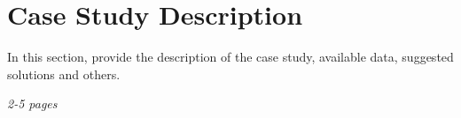\newpage
\chapter{Case Study Description}
In this section, provide the description of the case study, available data, suggested solutions and others.

\textit{2-5 pages}